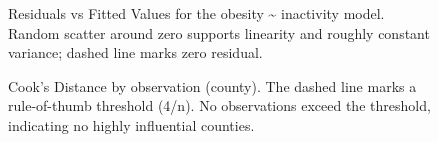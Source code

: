 \documentclass[
  letterpaper,
  DIV=11,
  numbers=noendperiod]{scrartcl}
\begin{document}
\begin{figure}[H]


\caption{\label{fig-residuals}Residuals vs Fitted Values for the obesity
\textasciitilde{} inactivity model. Random scatter around zero supports
linearity and roughly constant variance; dashed line marks zero
residual.}

\end{figure}%

\begin{figure}[H]


\caption{\label{fig-cooks}Cook's Distance by observation (county). The
dashed line marks a rule-of-thumb threshold (4/n). No observations
exceed the threshold, indicating no highly influential counties.}

\end{figure}%
\end{document}
